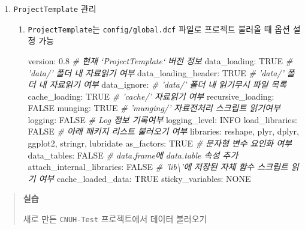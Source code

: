 \documentclass[12pt,a4paper]{book}
\newenvironment{Shaded}{\begin{snugshade}}{\end{snugshade}}
\newcommand{\CommentTok}[1]{\textcolor[rgb]{0.56,0.35,0.01}{\textit{#1}}}
\newcommand{\FunctionTok}[1]{\textcolor[rgb]{0.00,0.00,0.00}{#1}}
\newcommand{\AttributeTok}[1]{\textcolor[rgb]{0.77,0.63,0.00}{#1}}
\providecommand{\tightlist}{%
  \setlength{\itemsep}{0pt}\setlength{\parskip}{0pt}}
\theoremstyle{definition}
\theoremstyle{definition}
\theoremstyle{definition}
\theoremstyle{remark}
\begin{document}
\begin{enumerate}
\def\labelenumi{\arabic{enumi}.}
\setcounter{enumi}{2}
\tightlist
\item
  \texttt{ProjectTemplate} 관리

  \begin{enumerate}
  \def\labelenumii{\arabic{enumii})}
  \item
    \texttt{ProjectTemplate}는 \texttt{config/global.dcf} 파일로
    프로젝트 불러올 때 옵션 설정 가능

\begin{Shaded}
\begin{Highlighting}[]
\FunctionTok{version:}\AttributeTok{ 0.8 }\CommentTok{# 현재 `ProjectTemplate` 버전 정보}
\FunctionTok{data_loading:}\AttributeTok{ TRUE }\CommentTok{# 'data/' 폴더 내 자료읽기 여부 }
\FunctionTok{data_loading_header:}\AttributeTok{ TRUE }\CommentTok{# 'data/' 폴더 내 자료읽기 여부 }
\FunctionTok{data_ignore:}\AttributeTok{ }\CommentTok{# 'data/' 폴더 내 읽기무시 파일 목록}
\FunctionTok{cache_loading:}\AttributeTok{ TRUE }\CommentTok{# 'cache/' 자료읽기 여부}
\FunctionTok{recursive_loading:}\AttributeTok{ FALSE}
\FunctionTok{munging:}\AttributeTok{ TRUE }\CommentTok{# 'munging/' 자료전처리 스크립트 읽기여부}
\FunctionTok{logging:}\AttributeTok{ FALSE }\CommentTok{# Log 정보 기록여부 }
\FunctionTok{logging_level:}\AttributeTok{ INFO}
\FunctionTok{load_libraries:}\AttributeTok{ FALSE }\CommentTok{# 아래 패키지 리스트 불러오기 여부}
\FunctionTok{libraries:}\AttributeTok{ reshape, plyr, dplyr, ggplot2, stringr, lubridate}
\FunctionTok{as_factors:}\AttributeTok{ TRUE }\CommentTok{# 문자형 변수 요인화 여부}
\FunctionTok{data_tables:}\AttributeTok{ FALSE }\CommentTok{# data.frame에 data.table 속성 추가}
\FunctionTok{attach_internal_libraries:}\AttributeTok{ FALSE }\CommentTok{# 'lib\textbackslash{}'에 저장된 자체 함수 스크립트 읽기 여부}
\FunctionTok{cache_loaded_data:}\AttributeTok{  TRUE }
\FunctionTok{sticky_variables:}\AttributeTok{ NONE}
\end{Highlighting}
\end{Shaded}
  \end{enumerate}
\end{enumerate}

\begin{quote}
\colorbox{gray!10}{\begin{minipage}{15cm}
\textbf{실습}

새로 만든 \texttt{CNUH-Test} 프로젝트에서 데이터 불러오기
\end{minipage}}
\end{quote}
\end{document}
